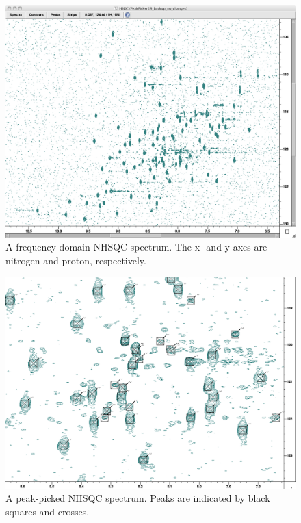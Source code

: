 \begin{figure}
  \includegraphics[scale=0.35]{figures/nhsqc}
  \caption[A frequency-domain NHSQC spectrum]
          {A frequency-domain NHSQC spectrum. 
           The x- and y-axes are nitrogen and proton, respectively.}
  \label{nhsqc}
\end{figure}

\begin{figure}
  \includegraphics[scale=0.35]{figures/nhsqc_peaks}
  \caption[A peak-picked NHSQC spectrum]
          {A peak-picked NHSQC spectrum. 
           Peaks are indicated by black squares and crosses.}
  \label{nhsqc_peaks}
\end{figure}

